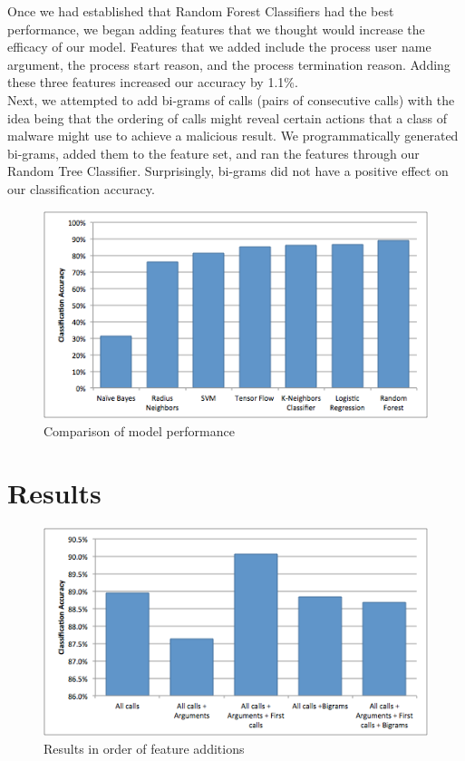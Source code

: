 \documentclass[11pt]{article}
\begin{document}
Once we had established that Random Forest Classifiers had the best performance, we began adding features that we thought would increase the efficacy of our model. Features that we added include the process user name argument, the process start reason, and the process termination reason. Adding these three features increased our accuracy by 1.1\%.\\

Next, we attempted to add bi-grams of calls (pairs of consecutive calls) with the idea being that the ordering of calls might reveal certain actions that a class of malware might use to achieve a malicious result. We programmatically generated bi-grams, added them to the feature set, and ran the features through our Random Tree Classifier. Surprisingly, bi-grams did not have a positive effect on our classification accuracy.\\

\begin{figure}[t]
\centering
\includegraphics[width=12cm]{model_performance}
\caption{Comparison of model performance}
\label{fig:model_performance}
\end{figure}

\section{Results}

\begin{figure}[t]
\centering
\includegraphics[width=12cm]{result_process}
\caption{Results in order of feature additions}
\label{fig:result_process}
\end{figure}
\end{document}
